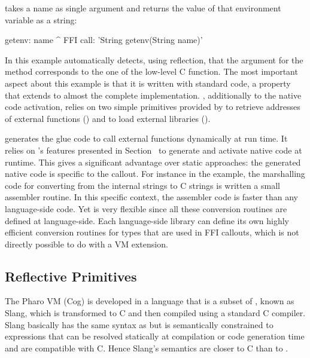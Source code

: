  takes a name as single argument and returns the value of that environment variable as a string:
%
\begin{stcode}{4}
getenv: name
    ^ FFI call: 'String getenv(String name)'
\end{stcode}
%
In this example \NB automatically detects, using reflection, that the argument for the \PH method corresponds to the one of the low-level C function.
The most important aspect about this example is that it is written with standard \ST code, a property that extends to almost the complete implementation.
\NB, additionally to the native code activation, relies on two simple primitives provided by \B to retrieve addresses of external functions () and to load external libraries ().

\NB generates the glue code to call external functions dynamically at run time.
It relies on \B's features presented in Section~ to generate and activate native code at runtime.
This gives \NB a significant advantage over static approaches: the generated native code is specific to the callout.
For instance in the  example, the marshalling code for converting from the internal \PH strings to C strings is written a small assembler routine.
In this specific context, the assembler code is faster than any language-side code.
Yet \NB is very flexible since all these conversion routines are defined at language-side. 
Each language-side library can define its own highly efficient conversion routines for types that are used in FFI callouts, which is not directly possible to do with a VM extension.


\newpage
\subsection{Reflective Primitives}
The Pharo VM (Cog) is developed in a language that is a subset of \ST, known as Slang, which is transformed to C and then compiled using a standard C compiler.  
Slang basically has the same syntax as \ST but is semantically constrained to expressions that can be resolved statically at compilation or code generation time and are compatible with C.
Hence Slang's semantics are closer to C than to \ST. 

